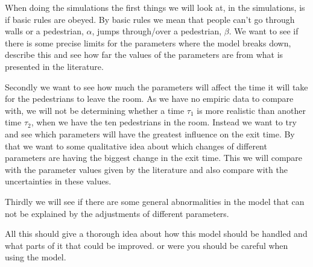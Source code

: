 When doing the simulations the first things we will look at, in the simulations, is if basic rules are obeyed. By basic rules we mean that people can't go through walls or a pedestrian, $\alpha$, jumps through/over a pedestrian, $\beta$. We want to see if there is some precise limits for the parameters where the model breaks down, describe this and see how far the values of the parameters are from what is presented in the literature.   

Secondly we want to see how much the parameters will affect the time it will take for the pedestrians to leave the room. As we have no empiric data to compare with, we will not be determining whether a time $\tau_1$ is more realistic than another time $\tau_2$, when we have the ten pedestrians in the room. Instead we want to try and see which parameters will have the greatest influence on the exit time. By that we want to some qualitative idea about which changes of different parameters are having the biggest change in the exit time. This we will compare with the parameter values given by the literature and also compare with the uncertainties in these values.

Thirdly we will see if there are some general abnormalities in the model that can not be explained by the adjustments of different parameters.

All this should give a thorough idea about how this model should be handled and what parts of it that could be improved. or were you should be careful when using the model.
